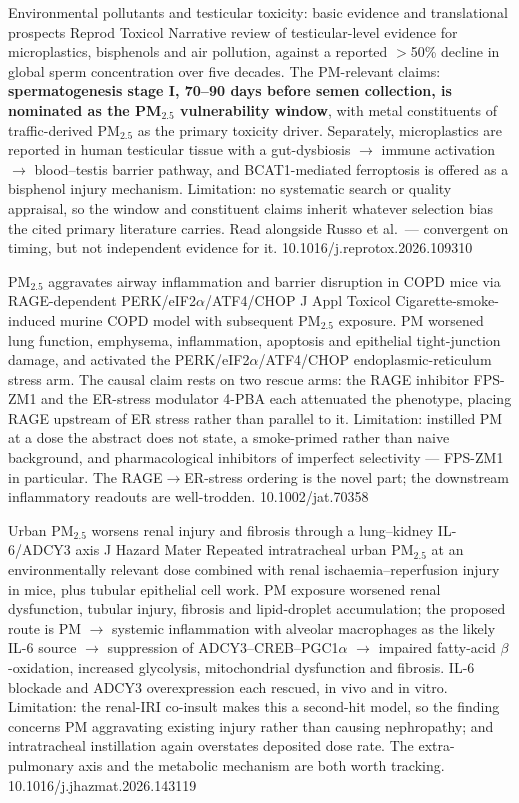 \documentclass[10pt]{article}
\begin{document}
{Environmental pollutants and testicular toxicity: basic evidence and translational
prospects}
{Reprod Toxicol}
{Narrative review of testicular-level evidence for microplastics, bisphenols and air
pollution, against a reported $>$50\% decline in global sperm concentration over five
decades. The PM-relevant claims: \textbf{spermatogenesis stage I, 70--90 days before
semen collection, is nominated as the PM$_{2.5}$ vulnerability window}, with metal
constituents of traffic-derived PM$_{2.5}$ as the primary toxicity driver. Separately,
microplastics are reported in human testicular tissue with a gut-dysbiosis $\rightarrow$
immune activation $\rightarrow$ blood--testis barrier pathway, and BCAT1-mediated
ferroptosis is offered as a bisphenol injury mechanism. Limitation: no systematic search
or quality appraisal, so the window and constituent claims inherit whatever selection
bias the cited primary literature carries. Read alongside Russo et al.\ --- convergent on
timing, but not independent evidence for it.}
{10.1016/j.reprotox.2026.109310}


{PM$_{2.5}$ aggravates airway inflammation and barrier disruption in COPD mice via
RAGE-dependent PERK/eIF2$\alpha$/ATF4/CHOP}
{J Appl Toxicol}
{Cigarette-smoke-induced murine COPD model with subsequent PM$_{2.5}$ exposure. PM
worsened lung function, emphysema, inflammation, apoptosis and epithelial tight-junction
damage, and activated the PERK/eIF2$\alpha$/ATF4/CHOP endoplasmic-reticulum stress arm.
The causal claim rests on two rescue arms: the RAGE inhibitor FPS-ZM1 and the ER-stress
modulator 4-PBA each attenuated the phenotype, placing RAGE upstream of ER stress rather
than parallel to it. Limitation: instilled PM at a dose the abstract does not state, a
smoke-primed rather than naive background, and pharmacological inhibitors of imperfect
selectivity --- FPS-ZM1 in particular. The RAGE$\rightarrow$ER-stress ordering is the novel
part; the downstream inflammatory readouts are well-trodden.}
{10.1002/jat.70358}

{Urban PM$_{2.5}$ worsens renal injury and fibrosis through a lung--kidney IL-6/ADCY3
axis}
{J Hazard Mater}
{Repeated intratracheal urban PM$_{2.5}$ at an environmentally relevant dose combined
with renal ischaemia--reperfusion injury in mice, plus tubular epithelial cell work.
PM exposure worsened renal dysfunction, tubular injury, fibrosis and lipid-droplet
accumulation; the proposed route is PM $\rightarrow$ systemic inflammation with alveolar
macrophages as the likely IL-6 source $\rightarrow$ suppression of ADCY3--CREB--PGC1$\alpha$
$\rightarrow$ impaired fatty-acid $\beta$-oxidation, increased glycolysis, mitochondrial
dysfunction and fibrosis. IL-6 blockade and ADCY3 overexpression each rescued, in vivo
and in vitro. Limitation: the renal-IRI co-insult makes this a second-hit model, so the
finding concerns PM aggravating existing injury rather than causing nephropathy; and
intratracheal instillation again overstates deposited dose rate. The extra-pulmonary axis
and the metabolic mechanism are both worth tracking.}
{10.1016/j.jhazmat.2026.143119}
\end{document}
